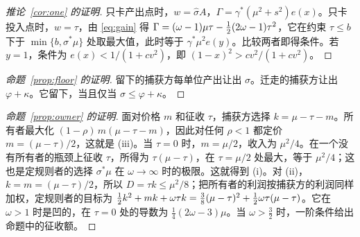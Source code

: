 \begin{proof}[推论~\ref{cor:one} 的证明]
只卡产出点时，\allowbreak $w=\hat\sigma A$，\allowbreak $\Gamma=\gamma^*(\mu^2+s^2)e(x)$。只卡投入点时，\allowbreak $w=\tau$，由 \eqref{eq:gain} 得 $\Gamma=(\omega-1)\mu\tau-\tfrac{1}{2}(2\omega-1)\tau^2$，它在约束
$\tau\le b$ 下于 $\min\{b,\sigma^*\mu\}$ 处取最大值，此时等于 $\gamma^*\mu^2e(y)$。比较两者即得条件。若 $y=1$，条件为 $e(x)<1/(1+cv^2)$，即 $(1-x)^2>cv^2/(1+cv^2)$。
\end{proof}

\begin{proof}[命题~\ref{prop:floor} 的证明]
留下的捕获方每单位产出让出 $\sigma$。迁走的捕获方让出 $\varphi+\kappa$。它留下，当且仅当
$\sigma\le\varphi+\kappa$。
\end{proof}

\begin{proof}[命题~\ref{prop:owner} 的证明]
面对价格 $m$ 和征收 $\tau$，捕获方选择 $k=\mu-\tau-m$。所有者最大化
$(1-\rho)\,m(\mu-\tau-m)$，因此对任何 $\rho<1$ 都定价 $m=(\mu-\tau)/2$，这就是 (iii)。当 $\tau=0$ 时，\allowbreak $m=\mu/2$，收入为 $\mu^2/4$。在一个没有所有者的瓶颈上征收 $\tau$，所得为
$\tau(\mu-\tau)$，在 $\tau=\mu/2$ 处最大，等于 $\mu^2/4$；这也是定规则者的选择
$\sigma^*\mu$ 在 $\omega\to\infty$ 时的极限。这就得到 (i)。对 (ii)，\allowbreak $k=m=(\mu-\tau)/2$，所以 $D=\tau k\le\mu^2/8$；把所有者的利润按捕获方的利润同样加权，定规则者的目标为
$\tfrac{1}{2} k^2+mk+\omega\tau k=\tfrac38(\mu-\tau)^2+\tfrac{1}{2}\omega\tau(\mu-\tau)$。它在
$\omega>1$ 时是凹的，在 $\tau=0$ 处的导数为 $\tfrac14(2\omega-3)\mu$。当
$\omega>\frac32$ 时，一阶条件给出命题中的征收额。
\end{proof}

{\renewcommand{\em}{}\renewcommand{\emph}[1]{#1}

}



